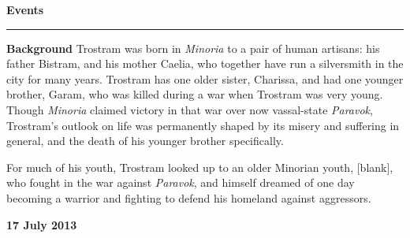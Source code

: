 \documentclass[letterpaper]{article}
\newlength\tindent
\newcommand{\e}[1]{\emph{#1}}
\newcommand{\B}[1]{\textbf{#1}}
\newenvironment{notesection}[1]
{ {\huge \B{#1}}\hrule\vspace{0.5em}\begingroup\fontsize{9pt}{12pt}\selectfont}
{\endgroup}
\begin{document}


\begin{notesection}{Events}
\setlength{\parindent}{\tindent}
\B{Background} Trostram was born in \e{Minoria} to a pair of human artisans: his father Bistram, and his mother Caelia, who together have run a silversmith in the city for many years.  Trostram has one older sister, Charissa, and had one younger brother, Garam, who was killed during a war when Trostram was very young. Though \e{Minoria} claimed victory in that war over now vassal-state \e{Paravok}, Trostram's outlook on life was permanently shaped by its misery and suffering in general, and the death of his younger brother specifically.  

For much of his youth, Trostram looked up to an older Minorian youth, [blank], who fought in the war against \e{Paravok}, and himself dreamed of one day becoming a warrior and fighting to defend his homeland against aggressors. 


\B{17 July 2013}
\end{notesection}
\end{document}
